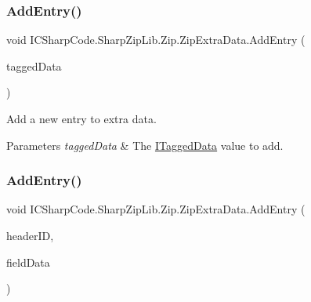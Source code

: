 \subsubsection{\texorpdfstring{Add\+Entry()}{AddEntry()}\hspace{0.1cm}{\footnotesize\ttfamily [1/4]}}
{\footnotesize\ttfamily void I\+C\+Sharp\+Code.\+Sharp\+Zip\+Lib.\+Zip.\+Zip\+Extra\+Data.\+Add\+Entry (\begin{DoxyParamCaption}\item[{\hyperlink{interface_i_c_sharp_code_1_1_sharp_zip_lib_1_1_zip_1_1_i_tagged_data}{I\+Tagged\+Data}}]{tagged\+Data }\end{DoxyParamCaption})\hspace{0.3cm}{\ttfamily [inline]}}



Add a new entry to extra data. 


\begin{DoxyParams}{Parameters}
{\em tagged\+Data} & The \hyperlink{interface_i_c_sharp_code_1_1_sharp_zip_lib_1_1_zip_1_1_i_tagged_data}{I\+Tagged\+Data} value to add.\\
\hline
\end{DoxyParams}
\mbox{\label{class_i_c_sharp_code_1_1_sharp_zip_lib_1_1_zip_1_1_zip_extra_data_a7b8994c059c3b2ecf4cc7a6a60e592ff}} 
\subsubsection{\texorpdfstring{Add\+Entry()}{AddEntry()}\hspace{0.1cm}{\footnotesize\ttfamily [2/4]}}
{\footnotesize\ttfamily void I\+C\+Sharp\+Code.\+Sharp\+Zip\+Lib.\+Zip.\+Zip\+Extra\+Data.\+Add\+Entry (\begin{DoxyParamCaption}\item[{int}]{header\+ID,  }\item[{byte \mbox{[}$\,$\mbox{]}}]{field\+Data }\end{DoxyParamCaption})\hspace{0.3cm}{\ttfamily [inline]}}



